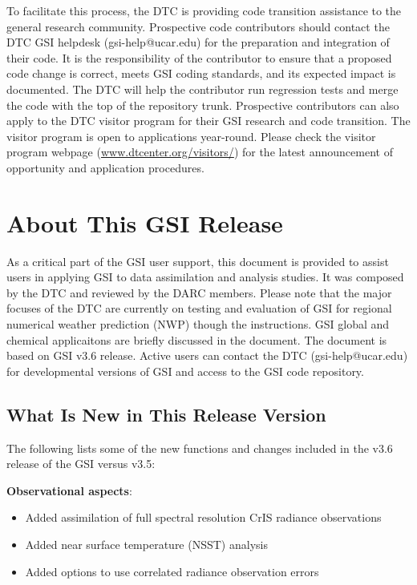 To facilitate this process, the DTC is providing code transition assistance to the general research community. Prospective code contributors should contact the DTC GSI helpdesk (gsi-help@ucar.edu) for the preparation and integration of their code.  It is the responsibility of the contributor to ensure that a proposed code change is correct, meets GSI coding standards, and its expected impact is documented. The DTC will help the contributor run regression tests and merge the code with the top of the repository trunk. Prospective contributors can also apply to the DTC visitor program for their GSI research and code transition. The visitor program is open to applications year-round. Please check the visitor program webpage (\url{www.dtcenter.org/visitors/}) for the latest announcement of opportunity and application procedures.  

\section{About This GSI Release}

As a critical part of the GSI user support, this document is provided to assist users in applying GSI to data assimilation and analysis studies. It was composed by the DTC and reviewed by the DARC members. Please note that the major focuses of the DTC are currently on testing and evaluation of GSI for regional numerical weather prediction (NWP) though the instructions. GSI global and chemical applicaitons are briefly discussed in the document. The document is based on GSI v3.6 release. Active users can contact the DTC (gsi-help@ucar.edu) for developmental versions of GSI and access to the GSI code repository.

\subsection{What Is New in This Release Version}

The following lists some of the new functions and changes included in the v3.6 release of the GSI versus v3.5:

\textbf{Observational aspects}:
\begin{itemize}
  \item Added assimilation of full spectral resolution CrIS radiance observations
  \item Added near surface temperature (NSST) analysis
  \item Added options to use correlated radiance observation errors
\end{itemize}

